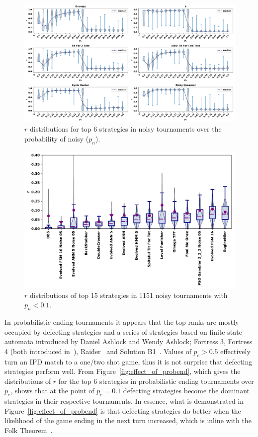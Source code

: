 \documentclass{article}
\begin{document}
\begin{figure}[!htbp]
    \centering
    \includegraphics[width=\textwidth]{../images/noise_effect.pdf}
    \caption{\(r\) distributions for top 6 strategies in noisy tournaments over
    the probability of noisy ($p_n$).}
    \label{fig:effect_of_noise}
\end{figure}

\begin{figure}[!htbp]
    \centering
    \includegraphics[width=.7\textwidth]{../images/noise_performance_subset.pdf}
    \caption{$r$ distributions of top 15 strategies in 1151 noisy tournaments with \(p_n < 0.1\).}\label{fig:noise_results}
\end{figure}

In probabilistic ending tournaments it appears that the top ranks are mostly
occupied by defecting strategies and a series of strategies based on finite state
automata introduced by Daniel Ashlock and Wendy Ashlock; Fortress 3, Fortress 4
(both introduced in~\cite{Ashlock2006}), Raider~\cite{Ashlock2014} and
Solution B1~\cite{Ashlock2014}. Values of \(p_e > 0.5\) effectively turn an IPD
match to a one/two shot game, thus it is not surprise that defecting strategies
perform well. From Figure~\ref{fig:effect_of_probend}, which gives the
distributions of \(r\) for the top 6 strategies in probabilistic ending tournaments
over \(p_e\), shows that at the point of \(p_e=0.1\) defecting strategies become
the dominant strategies in their respective tournaments. In essence, what is
demonstrated in Figure~\ref{fig:effect_of_probend} is that defecting strategies
do better when the likelihood of the game ending in the next turn increased,
which is inline with the Folk Theorem~\cite{Fudenberg2009}.
\end{document}
